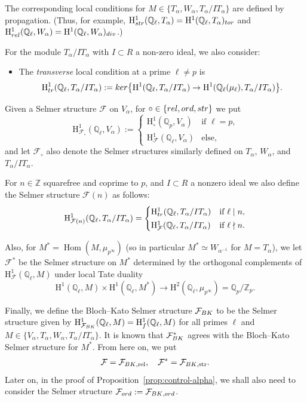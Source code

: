 \documentclass[10pt,reqno]{amsart}
\numberwithin{equation}{section}
\theoremstyle{plain}
\theoremstyle{definition}
\theoremstyle{definition}
\theoremstyle{plain}
\theoremstyle{plain}
\theoremstyle{plain}
\theoremstyle{plain}
\theoremstyle{plain}
\theoremstyle{plain}
\newcommand{\Hom}{\operatorname{Hom}}
\newcommand{\Z}{\mathbb{Z}}
\newcommand{\Q}{\mathbb{Q}}
\newcommand{\cF}{\mathcal{F}}
\newcommand{\Fcal}{\mathcal{F}}
\newcommand{\rH}{\mathrm{H}}
\begin{document}
The corresponding local conditions for $M\in\{T_\alpha,W_\alpha,T_\alpha/IT_\alpha\}$ are defined by propagation. (Thus, for example, $\rH^1_{\rm str}(\Q_\ell,T_\alpha)=\rH^1(\Q_\ell,T_\alpha)_{\rm tor}$ and $\rH^1_{\rm rel}(\Q_\ell,W_\alpha)=\rH^1(\Q_\ell,W_\alpha)_{\rm div}$.) 

For the module $T_\alpha/IT_\alpha$ with $I\subset R$ a non-zero ideal,  we also consider:
\begin{itemize}
\item The \emph{transverse} local condition at a prime $\ell\neq p$ is
\[
\rH^1_{\rm tr}(\Q_\ell,T_\alpha/IT_\alpha):={\rm ker}\bigl\{\rH^1(\Q_\ell,T_\alpha/IT_\alpha)\rightarrow\rH^1(\Q_\ell(\mu_{\ell}),T_\alpha/IT_\alpha)\bigr\}.
\]
\end{itemize}

Given a Selmer structure $\mathcal{F}$ on $V_\alpha$, for $\circ\in \{ {\rm rel},{\rm ord},{\rm str}\}$ we put
\[
\rH^1_{\Fcal_{\circ}}(\Q_{\ell},V_\alpha):=
\begin{cases}
\rH^1_{\circ}(\Q_p,V_\alpha) & \textrm{if $\ell =p$,}\\[0.2em]
\rH^1_\cF(\Q_{\ell},V_\alpha)& \textrm{else,}
\end{cases}
\]
and let $\Fcal_{\circ}$ also denote the Selmer structures similarly defined on $T_\alpha$, $W_\alpha$, and $T_\alpha/IT_\alpha$.

For $n\in \Z$ squarefree and coprime to $p$, and $I\subset R$ a nonzero ideal we also define the Selmer structure $\Fcal(n)$ as follows:
\[
\rH^1_{\Fcal(n)}(\Q_{\ell},T_\alpha/IT_\alpha)
=\begin{cases}
\rH^1_{\rm tr}(\Q_{\ell},T_\alpha/IT_\alpha) &\text{if }\ell\mid n, \\[0.2em]
\rH^1_{\Fcal}(\Q_{\ell},T_\alpha/IT_\alpha) & \text{if }\ell\nmid n.
\end{cases}
\]

Also, for $M^*=\Hom(M,\mu_{p^{\infty}})$ (so in particular $M^*\simeq W_{\alpha^{-1}}$ for $M=T_\alpha$),  
we let $\mathcal{F}^*$ be the Selmer structure on $M^*$ determined by the orthogonal complements of $\rH^1_{\mathcal{F}}(\Q_\ell,M)$ under local Tate duality 
\[
\rH^1(\Q_\ell,M)\times\rH^1(\Q_\ell,M^*)\rightarrow\rH^2(\Q_\ell,\mu_{p^\infty}) = \Q_p/\Z_p.
\]

Finally, we define the Bloch--Kato Selmer structure $\cF_{\rm{BK}}$ to be the Selmer structure given by
$\rH^1_{\cF_{\rm{BK}}}(\Q_\ell,M) = \rH^1_f(\Q_\ell,M)$ for all primes $\ell$ and $M\in\{V_\alpha,T_\alpha,W_\alpha,T_\alpha/IT_\alpha\}$.
It is known that $\cF_{\rm{BK}}^*$ agrees with the Bloch--Kato Selmer structure for $M^*$. 
From here on, we put  
\[
\Fcal=\Fcal_{\rm{BK},\operatorname{rel}},\quad\Fcal^*=\Fcal_{\rm{BK},\operatorname{str}}.
\] 
Later on, in the proof of Proposition~\ref{prop:control-alpha}, we shall also need to consider the Selmer structure $\Fcal_{\rm ord} := \Fcal_{\rm{BK},\rm{ord}}$.
\end{document}
